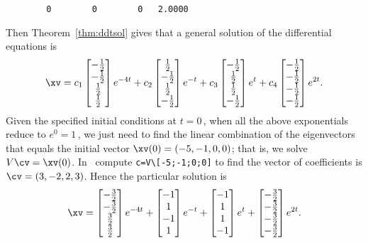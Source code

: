 \begin{example}
\begin{solution}
\begin{verbatim}
        0        0        0   2.0000
\end{verbatim}
Then Theorem~\ref{thm:ddtsol} gives that a general solution of the differential equations is
\begin{equation*}
\xv=
c_1\begin{bmatrix} -\tfrac12\\-\tfrac12\\\tfrac12\\\tfrac12 \end{bmatrix}e^{-4t}
+c_2\begin{bmatrix} \tfrac12\\-\tfrac12\\\tfrac12\\-\tfrac12 \end{bmatrix}e^{-t}
+c_3\begin{bmatrix} -\tfrac12\\\tfrac12\\\tfrac12\\-\tfrac12 \end{bmatrix}e^{t}
+c_4\begin{bmatrix} -\tfrac12\\-\tfrac12\\-\tfrac12\\-\tfrac12 \end{bmatrix}e^{2t}.
\end{equation*}
Given the specified initial conditions at \(t=0\)\,, when all the above exponentials reduce to \(e^0=1\)\,, we just need to find the linear combination of the eigenvectors that equals the initial vector \(\xv(0)=(-5,-1,0,0)\); that is, we solve \(V\cv=\xv(0)\).
In \script\ compute \verb|c=V\[-5;-1;0;0]| to find the vector of coefficients is \(\cv=(3,-2,2,3)\).
Hence the particular solution is
\begin{equation*}
\xv=
\begin{bmatrix} -\tfrac32\\-\tfrac32\\\tfrac32\\\tfrac32 \end{bmatrix}e^{-4t}
+\begin{bmatrix} -1\\1\\-1\\1 \end{bmatrix}e^{-t}
+\begin{bmatrix} -1\\1\\1\\-1 \end{bmatrix}e^{t}
+\begin{bmatrix} -\tfrac32\\-\tfrac32\\-\tfrac32\\-\tfrac32 \end{bmatrix}e^{2t}.
\end{equation*}
\end{solution}
\end{example}








